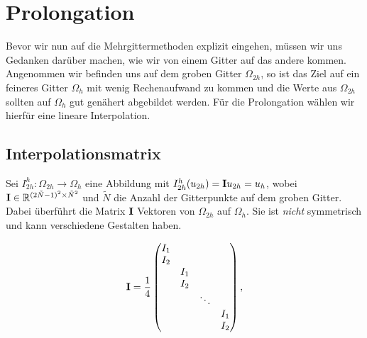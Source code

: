 




\section{Prolongation}

Bevor wir nun auf die Mehrgittermethoden explizit eingehen, müssen wir uns Gedanken darüber machen, wie wir von einem Gitter auf das andere kommen. Angenommen wir befinden uns auf dem groben Gitter $\Omega_{2h}$, so ist das Ziel auf ein feineres Gitter $\Omega_{h}$ mit wenig Rechenaufwand zu kommen und die Werte aus $\Omega_{2h}$ sollten auf $\Omega_{h}$ gut genähert abgebildet werden. Für die Prolongation wählen wir hierfür eine lineare Interpolation.

\subsection{Interpolationsmatrix}

Sei $I^{h}_{2h}: \Omega_{2h} \longrightarrow \Omega_{h}$ eine Abbildung mit $I_{2h}^{h}(u_{2h}) = {\textbf{I}}u_{2h} = u_{h}$, wobei ${\textbf{I}} \in \mathbb{R}^{(2 \tilde N - 1)^{2} \times \tilde N^{2}}$ und $\tilde N$ die Anzahl der Gitterpunkte auf dem groben Gitter. Dabei überführt die Matrix ${\textbf{I}}$ Vektoren von $\Omega_{2h}$ auf $\Omega_{h}$. Sie ist \textit{nicht} symmetrisch und kann verschiedene Gestalten haben.

\begin{equation}
{\textbf{I}} = \frac {1} {4}
\begin{pmatrix}
I_{1} & & &\\
I_{2} & & &\\
& I_{1} & &\\
& I_{2} & &\\
& & \ddots &\\
& & & I_{1}\\
& & & I_{2}
\end{pmatrix},
\end{equation}

